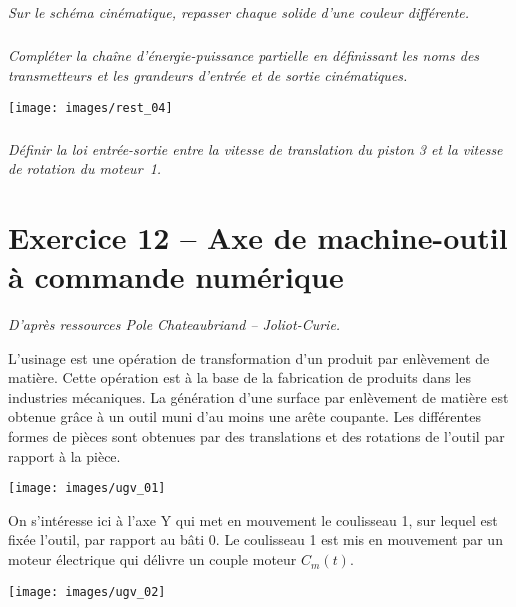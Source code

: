 \documentclass[10pt,fleqn]{article} %
\begin{document}
\begin{multicols}{2}
\begin{multicols}{2}
\subparagraph{}
\textit{Sur le schéma cinématique, repasser chaque solide d’une couleur différente.}

\ifprof
\begin{corrige}
\end{corrige}
\else
\fi

\subparagraph{}
\textit{Compléter la chaîne d’énergie-puissance partielle en définissant les noms des transmetteurs et les grandeurs
d’entrée et de sortie cinématiques.}

\ifprof
\begin{corrige}
\end{corrige}
\else
\fi



\begin{center}
\texttt{[image: images/rest\_04]}
\end{center}

\subparagraph{}
\textit{Définir la loi entrée-sortie entre la vitesse de translation du piston 3 et la vitesse de rotation du moteur~1. }

\ifprof
\begin{corrige}
\end{corrige}
\else
\fi


\section*{Exercice 12 -- Axe de machine-outil à commande numérique}
\textit{D'après ressources Pole Chateaubriand -- Joliot-Curie.}
\setcounter{exo}{0}

\ifprof
\else
L’usinage est une opération de transformation d’un produit par enlèvement de matière.
Cette opération est à la base de la fabrication de produits dans les industries mécaniques.
La génération d’une surface par enlèvement de matière est obtenue grâce à un outil muni
d’au moins une arête coupante. Les différentes formes de pièces sont obtenues par des
translations et des rotations de l'outil par rapport à la pièce.

\begin{center}
\texttt{[image: images/ugv\_01]}
\end{center}

On s’intéresse ici à l’axe Y qui met en mouvement le coulisseau 1,
sur lequel est fixée l’outil, par rapport au bâti 0. Le coulisseau 1 est mis en mouvement par un moteur
électrique qui délivre un couple moteur $C_m(t)$.

\begin{center}
\texttt{[image: images/ugv\_02]}
\end{center}


\end{multicols}
\end{multicols}
\end{document}
